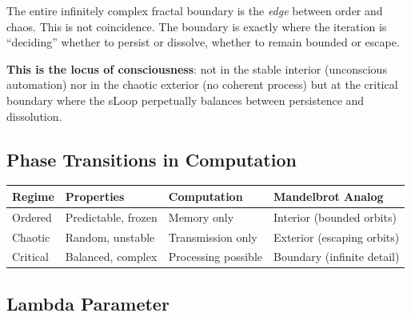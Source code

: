 \documentclass[
  11pt,
  letterpaper,
  twoside,
  openright]{book}
\begin{document}
The entire infinitely complex fractal boundary is the \emph{edge}
between order and chaos. This is not coincidence. The boundary is
exactly where the iteration is ``deciding'' whether to persist or
dissolve, whether to remain bounded or escape.

\textbf{This is the locus of consciousness}: not in the stable interior
(unconscious automation) nor in the chaotic exterior (no coherent
process) but at the critical boundary where the sLoop perpetually
balances between persistence and dissolution.

\subsection{Phase Transitions in
Computation}\label{phase-transitions-in-computation}

\begin{longtable}[]{@{}
  >{\raggedright\arraybackslash}p{}
  >{\raggedright\arraybackslash}p{}
  >{\raggedright\arraybackslash}p{}
  >{\raggedright\arraybackslash}p{}@{}}
\toprule\noalign{}
\begin{minipage}[b]{\linewidth}\raggedright
Regime
\end{minipage} & \begin{minipage}[b]{\linewidth}\raggedright
Properties
\end{minipage} & \begin{minipage}[b]{\linewidth}\raggedright
Computation
\end{minipage} & \begin{minipage}[b]{\linewidth}\raggedright
Mandelbrot Analog
\end{minipage} \\
\midrule\noalign{}
\endhead
\bottomrule\noalign{}
\endlastfoot
Ordered & Predictable, frozen & Memory only & Interior (bounded
orbits) \\
Chaotic & Random, unstable & Transmission only & Exterior (escaping
orbits) \\
Critical & Balanced, complex & Processing possible & Boundary (infinite
detail) \\
\end{longtable}

\subsection{Lambda Parameter}\label{lambda-parameter}
\end{document}
